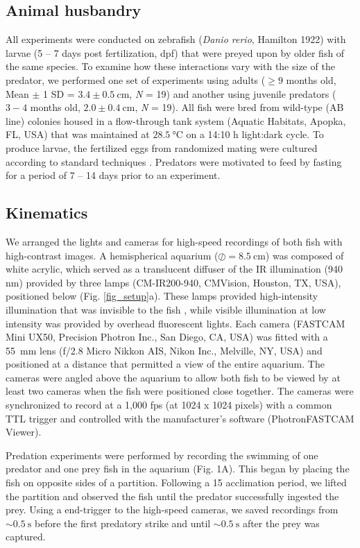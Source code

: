 \documentclass[]{rsos}%
\begin{document}
\subsection{Animal husbandry}
All experiments were conducted on zebrafish (\textit{Danio rerio}, Hamilton 1922) with larvae (5 -- 7 days post fertilization, dpf) that were preyed upon by older fish of the same species. 
To examine how these interactions vary with the size of the predator, we performed one set of experiments using adults ($\geq 9$ months old, Mean $\pm$ 1 SD = $3.4 \pm \SI{0.5}{\cm}$, \textit{N} = 19) and another using juvenile predators ($3-4$ months old, $2.0  \pm  \SI{0.4}{\cm}$, \textit{N} = 19).
All fish were bred from wild-type (AB line) colonies housed in a flow-through tank system (Aquatic Habitats, Apopka, FL, USA) that was maintained at $\SI{28.5}{\celsius}$ on a 14:10 h light:dark cycle. 
To produce larvae, the fertilized eggs from randomized mating were cultured according to standard techniques \cite{Westerfield:UXiBrEuA}.
Predators were motivated to feed by fasting for a period of 7 -- 14 days prior to an experiment.


\subsection{Kinematics}
We arranged the lights and cameras for high-speed recordings of both fish with high-contrast images. 
A hemispherical aquarium ($\oslash = \SI{8.5}{\cm}$) was composed of white acrylic, which served as a translucent diffuser of the IR illumination (940 nm) provided by three lamps (CM-IR200-940, CMVision, Houston, TX, USA), positioned below (Fig. \ref{fig_setup}a). 
These lamps provided high-intensity illumination that was invisible to the fish \cite{Robinson:1993tu}, while visible illumination at low intensity was provided by overhead fluorescent lights.
Each camera (FASTCAM Mini UX50, Precision Photron Inc., San Diego, CA, USA) was fitted with a \SI{55}{\mm} lens (f/2.8 Micro Nikkon AIS, Nikon Inc., Melville, NY, USA) and positioned at a distance that permitted a view of the entire aquarium. 
The cameras were angled above the aquarium to allow both fish to be viewed by at least two cameras when the fish were positioned close together.
The cameras were synchronized to record at a 1,000 fps (at 1024 x 1024 pixels) with a common TTL trigger and controlled with the manufacturer's software (PhotronFASTCAM Viewer).

Predation experiments were performed by recording the swimming of one predator and one prey fish in the aquarium (Fig. 1A). 
This began by placing the fish on opposite sides of a partition.
Following a \SI{15}{\min} acclimation period, we lifted the partition and observed the fish until the predator successfully ingested the prey.
Using a end-trigger to the high-speed cameras, we saved recordings from $\sim \SI{0.5}{\s}$ before the first predatory strike and until $\sim \SI{0.5}{\s}$  after the prey was captured.
\end{document}
